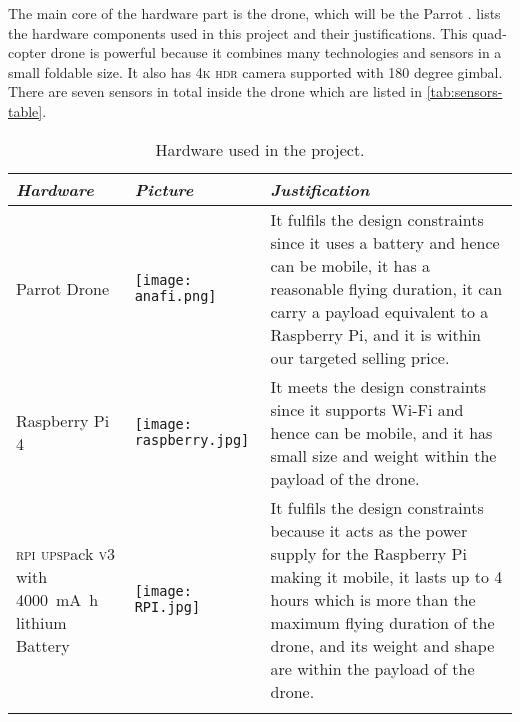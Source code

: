 \documentclass[../main.tex]{subfiles}
\begin{document}
The main core of the hardware part is the drone, 
which will be the Parrot \anafi.
 lists the hardware components
used in this project and their justifications. This quad-copter
drone is powerful because it combines many technologies 
and sensors in a small foldable size. It also has 4\textsc{k}
\textsc{hdr} camera supported with 180 degree gimbal. 
There are seven sensors in total inside the drone which are listed in 
\cref{tab:sensors-table}. 

\begin{table}[p]
	\centering
	\caption{Hardware used in the project.}
	\label{tab:hardware-used}  
	\begin{tabular}{ p{4cm} p{3cm} p{6cm} }
		\toprule
		\textit{Hardware} 
		& \textit{Picture} 
		& \textit{Justification} \\ 
		
		\midrule
		
		Parrot \anafi Drone  
		& \begin{minipage}{.1\textwidth}
			\texttt{[image: anafi.png]}
		\end{minipage} 
                & It fulfils the design constraints since it uses a
                battery and hence can be mobile, it has a reasonable
                flying duration, it can carry a payload equivalent
                to a Raspberry Pi, and it is within our targeted
                selling price. \\ 
		\addlinespace
		
		Raspberry Pi 4  
		& \begin{minipage}{.0\textwidth}
			\texttt{[image: raspberry.jpg]}
		\end{minipage} 
                & It meets the design constraints since it supports
                Wi-Fi and hence can be mobile, and it has small size
                and weight within the payload of the drone. \\ 
		\addlinespace
		
		\textsc{rpi} \textsc{upsp}ack \textsc{v}3 with 
		\SI{4000}{\milli\ampere\hour} 
		lithium Battery  
		& \begin{minipage}{.1\textwidth}
			\texttt{[image: RPI.jpg]}
		\end{minipage}  
                & It fulfils the design constraints because it acts as
                the power supply for the Raspberry Pi making it
                mobile, it lasts up to 4 hours which is more than the
                maximum flying duration of the drone, and its weight
                and shape are within the payload of the drone.  \\ 
		\addlinespace
		

\end{tabular}
\end{table}
\end{document}
